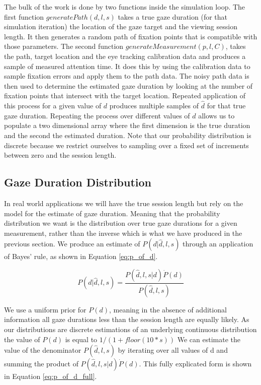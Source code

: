 \documentclass[12pt,a4paper]{article}
\numberwithin{equation}{section}
\begin{document}
The bulk of the work is done by two functions inside the simulation loop. The first function
$generatePath(d,l,s)$ takes a true gaze duration (for that simulation iteration) the location
of the gaze target and the viewing session length. It then
generates a random path of fixation points that is compatible with those parameters.
The second function 
$generateMeasurement(p,l,C)$, takes the path, target location and the eye tracking calibration 
data and produces a sample of measured attention time. It does this by using the calibration data to sample
fixation errors and apply them to the path data. The noisy path data is then used to determine
the estimated gaze duration by looking at the number of fixation points that intersect with the target
location.
Repeated application of this process for a given value of $d$ produces multiple samples of $\hat{d}$
for that true gaze duration. Repeating the process over different 
values of $d$ allows us to populate a two dimensional array where the first dimension is the
true duration and the second the estimated duration. Note that our probability distribution is discrete
because we restrict ourselves to sampling over a fixed set of increments 
between zero and the session length.

\subsection{Gaze Duration Distribution}

In real world applications we will have the true session length but rely on the model for the 
estimate of gaze duration. Meaning that the probability distribution we want is the distribution 
over true gaze durations for a given measurement, rather than the inverse which is what we 
have produced in the previous section. We produce an estimate of $P(d|\hat{d},l,s)$
through an application of Bayes' rule, as shown in Equation \ref{eq:p_of_d}.

\begin{equation}
\label{eq:p_of_d}
P(d|\hat{d},l,s) =  \frac{ P(\hat{d},l,s|d) \dot P(d) }{ P(\hat{d},l,s)  }
\end{equation}

We use a uniform prior for $P(d)$, meaning in the absence of additional information all
gaze durations less than the session length are equally likely. As our distributions are
discrete estimations of an underlying continuous distribution the value of $P(d)$ is
equal to $1/(1+floor(10*s))$
 We can estimate the value
of the denominator $P(\hat{d},l,s)$ by iterating over all values of d and summing the product
of $ P(\hat{d},l,s|d) \dot P(d)$. This fully explicated form is shown in 
Equation \ref{eq:p_of_d_full}.
\end{document}
